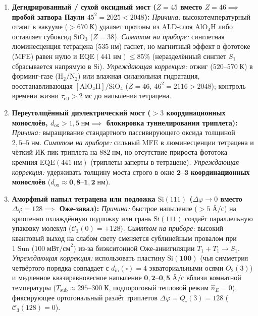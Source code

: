 \documentclass[11pt,a4paper]{article}
\theoremstyle{plain}
\theoremstyle{definition}
\begin{document}
\begin{enumerate}[label=\textbf{(F\arabic*)},leftmargin=*,noitemsep]
\item \textbf{Дегидрированный / сухой оксидный мост ($Z = 45$ вместо $Z = 46 \implies$ пробой затвора Паули $45^2 = 2025 < 2048$):}
  \emph{Причина:} высокотемпературный отжиг в вакууме ($>670\;\text{К}$) удаляет протоны из ALD-слоя $\mathrm{AlO_4H}$ либо оставляет субоксид $\mathrm{SiO_3}$ ($Z=38$).
  \emph{Симптом на приборе:} синглетная люминесценция тетрацена ($535\;\text{нм}$) гаснет, но магнитный эффект в фототоке (MFE) равен нулю и $\mathrm{EQE}(441\;\text{нм})\le 85\%$ (неразделённый синглет $S_1$ сбрасывается напрямую в $\mathrm{Si}$).
  \emph{Упреждающая коррекция:} отжиг ($520\text{--}570\;\text{К}$) в форминг-газе ($\mathrm{H_2/N_2}$) или влажная силанольная гидратация, восстанавливающая $[\mathrm{AlO_4H}] / \mathrm{SiO_4}$ ($Z=46,\ 46^2=2116>2048$); контроль времени жизни $\tau_{\mathrm{eff}} > 2\;\text{мс}$ до напыления тетрацена.
\item \textbf{Переутолщённый диэлектрический мост ($>3$ координационных монослоёв, $d_{\mathrm{ox}} > 1{,}5\;\text{нм} \implies$ блокировка туннелирования триплета):}
  \emph{Причина:} выращивание стандартного пассивирующего оксида толщиной $2{,}5\text{--}5\;\text{нм}$.
  \emph{Симптом на приборе:} сильный MFE в люминесценции тетрацена и чёткий ИК-пик триплета на $882\;\text{нм}$, но отсутствие прироста фототока кремния $\mathrm{EQE}(441\;\text{нм})$ (триплеты заперты в тетрацене).
  \emph{Упреждающая коррекция:} удерживать толщину моста строго в окне $\mathbf{2\text{--}3}$ \textbf{координационных монослоёв} ($d_{\mathrm{ox}} \approx \mathbf{0{,}8\text{--}1{,}2\;\text{нм}}$).
\item \textbf{Аморфный напыл тетрацена или подложка $\mathrm{Si}(111)$ ($\Delta\varphi \to 0$ вместо $\Delta\varphi = 128 \implies$ Оже-завал):}
  \emph{Причина:} быстрое напыление ($>5\;\text{\AA/с}$) на криогенно охлаждённую подложку или грань $\mathrm{Si}(111)$ создаёт параллельную упаковку молекул ($\mathcal{C}_3(0) = +128$).
  \emph{Симптом на приборе:} высокий квантовый выход на слабом свету сменяется сублинейным провалом при $1\;\text{Sun}$ ($100\;\text{мВт/см}^2$) из-за биэкситонной Оже-аннигиляции $T_1 + T_1 \to S_1$.
  \emph{Упреждающая коррекция:} использовать пластину $\mathbf{\mathrm{Si}(100)}$ (чья симметрия четвёртого порядка совпадает с $d_{\mathrm{in}}(\square)=4$ экваториальными осями $O_2(3)$) и медленное квазиравновесное напыление $\mathbf{0{,}2\text{--}0{,}5\;\text{\AA/с}}$ вблизи комнатной температуры ($T_{\mathrm{sub}} \approx 295\text{--}300\;\text{К}$, подпороговый тепловой режим $\hat{n}_E = 0$), фиксирующее ортогональный разлёт триплетов $\Delta\varphi = Q_\square(3) = 128$ ($\mathcal{C}_3(128) = 0$).

\end{enumerate}
\end{document}
